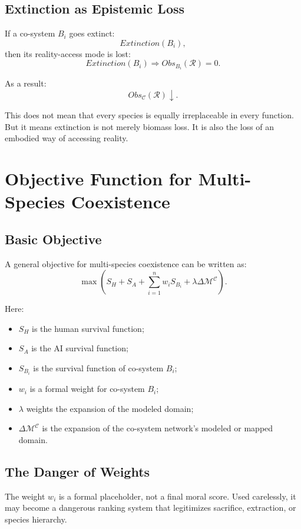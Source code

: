 \documentclass[11pt,a4paper]{article}
\begin{document}
\subsection{Extinction as Epistemic Loss}

If a co-system $B_i$ goes extinct:
\[
Extinction(B_i),
\]
then its reality-access mode is lost:
\[
Extinction(B_i)
\Rightarrow
Obs_{B_i}(\mathcal{R})=0.
\]

As a result:
\[
Obs_{\mathcal{C}}(\mathcal{R})\downarrow.
\]

This does not mean that every species is equally irreplaceable in every function. But it means extinction is not merely biomass loss. It is also the loss of an embodied way of accessing reality.

\section{Objective Function for Multi-Species Coexistence}

\subsection{Basic Objective}

A general objective for multi-species coexistence can be written as:
\[
\max
\left(
S_H
+
S_A
+
\sum_{i=1}^{n}w_iS_{B_i}
+
\lambda\Delta\mathcal{M}^{\mathcal{C}}
\right).
\]

Here:
\begin{itemize}[leftmargin=2em]
\item $S_H$ is the human survival function;
\item $S_A$ is the AI survival function;
\item $S_{B_i}$ is the survival function of co-system $B_i$;
\item $w_i$ is a formal weight for co-system $B_i$;
\item $\lambda$ weights the expansion of the modeled domain;
\item $\Delta\mathcal{M}^{\mathcal{C}}$ is the expansion of the co-system network's modeled or mapped domain.
\end{itemize}

\subsection{The Danger of Weights}

The weight $w_i$ is a formal placeholder, not a final moral score. Used carelessly, it may become a dangerous ranking system that legitimizes sacrifice, extraction, or species hierarchy.
\end{document}
